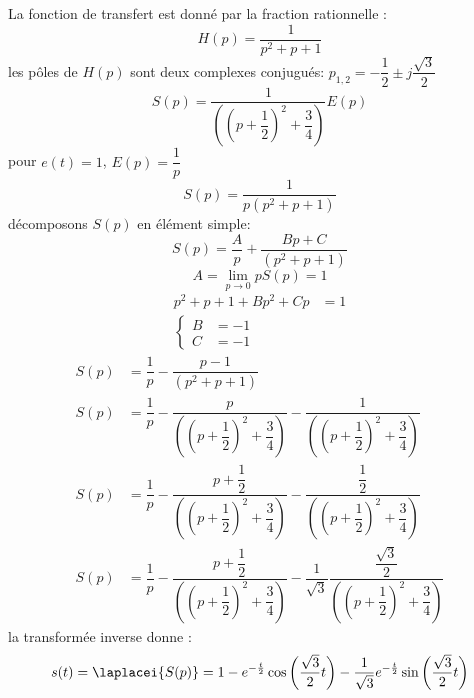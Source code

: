La fonction de transfert est donné par la fraction rationnelle :
\[
H(p)=\dfrac{1}{p^2+p+1}
\]
les pôles de $H(p)$ sont deux complexes conjugués: 
$p_{1,2}=-\dfrac{1}{2}\pm j\dfrac{\sqrt{3}}{2}$
\[
S(p) = \dfrac{1}{\left(\left(p+\dfrac{1}{2}\right)^2+
       \dfrac{3}{4}\right)}E(p)
\]
pour $e(t)=1$, $E(p)=\dfrac{1}{p}$
\[
S(p) =\dfrac{1}{p\left(p^2+p+1\right)}
\]
décomposons $S(p)$ en élément simple:
\[
S(p)=\dfrac{A}{p}+\dfrac{Bp+C}{\left(p^2+p+1\right)}
\]
\[
A=\lim\limits_{p \rightarrow 0} pS(p) = 1
\]
\begin{align*}
    p^2+p+1 + Bp^2+Cp &= 1 \\
    \begin{cases}
        B&=-1\\
        C&=-1
    \end{cases}
\end{align*}
\begin{align*}
    S(p)&=\dfrac{1}{p}-\dfrac{p-1}{\left(p^2+p+1\right)} \\
    S(p)&=\dfrac{1}{p}-\dfrac{p}{\left(\left(p+\dfrac{1}{2}\right)^2+
          \dfrac{3}{4}\right)}-
          \dfrac{1}{\left(\left(p+\dfrac{1}{2}\right)^2+\dfrac{3}{4}\right)}\\
    S(p)&=\dfrac{1}{p}-\dfrac{p+\dfrac{1}{2}}
                       {\left(\left(p+\dfrac{1}{2}\right)^2+
                                      \dfrac{3}{4}\right)}-
                       \dfrac{\dfrac{1}{2}}{\left(\left(p+\dfrac{1}{2}\right)^2+
                              \dfrac{3}{4}\right)}\\
    S(p)&=\dfrac{1}{p}-\dfrac{p+\dfrac{1}{2}}
                             {\left(\left(p+\dfrac{1}{2}\right)^2+
                                            \dfrac{3}{4}\right)}-
                       \dfrac{1}{\sqrt{3}}\dfrac{\dfrac{\sqrt{3}}{2}}
                       {\left(\left(p+\dfrac{1}{2}\right)^2+
                                      \dfrac{3}{4}\right)}
\end{align*}
la transformée inverse donne :
\[
s(t) = \laplacei{S(p)}=
1-e^{-\frac{t}{2}}\cos{\left(\dfrac{\sqrt{3}}{2}t\right)}-
\dfrac{1}{\sqrt{3}}e^{-\frac{t}{2}}\sin{\left(\dfrac{\sqrt{3}}{2}t\right)}
\]
